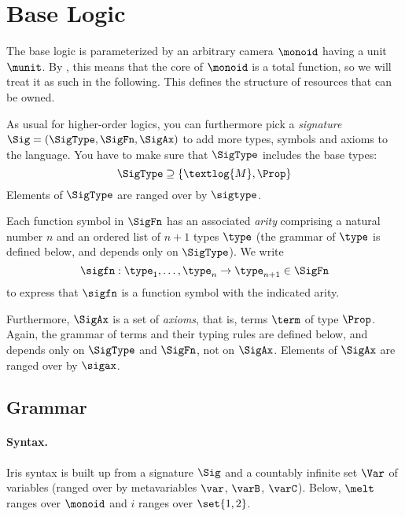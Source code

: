 \section{Base Logic}
\label{sec:base-logic}

The base logic is parameterized by an arbitrary camera $\monoid$ having a unit $\munit$.
By , this means that the core of $\monoid$ is a total function, so we will treat it as such in the following.
This defines the structure of resources that can be owned.

As usual for higher-order logics, you can furthermore pick a \emph{signature} $\Sig = (\SigType, \SigFn, \SigAx)$ to add more types, symbols and axioms to the language.
You have to make sure that $\SigType$ includes the base types:
\[
	\SigType \supseteq \{ \textlog{M}, \Prop \}
\]
Elements of $\SigType$ are ranged over by $\sigtype$.

Each function symbol in $\SigFn$ has an associated \emph{arity} comprising a natural number $n$ and an ordered list of $n+1$ types $\type$ (the grammar of $\type$ is defined below, and depends only on $\SigType$).
We write
\[
	\sigfn : \type_1, \dots, \type_n \to \type_{n+1} \in \SigFn
\]
to express that $\sigfn$ is a function symbol with the indicated arity.

Furthermore, $\SigAx$ is a set of \emph{axioms}, that is, terms $\term$ of type $\Prop$.
Again, the grammar of terms and their typing rules are defined below, and depends only on $\SigType$ and $\SigFn$, not on $\SigAx$.
Elements of $\SigAx$ are ranged over by $\sigax$.

\subsection{Grammar}\label{sec:grammar}

\paragraph{Syntax.}
Iris syntax is built up from a signature $\Sig$ and a countably infinite set $\Var$ of variables (ranged over by metavariables $\var$, $\varB$, $\varC$).
Below, $\melt$ ranges over $\monoid$ and $i$ ranges over $\set{1,2}$.

